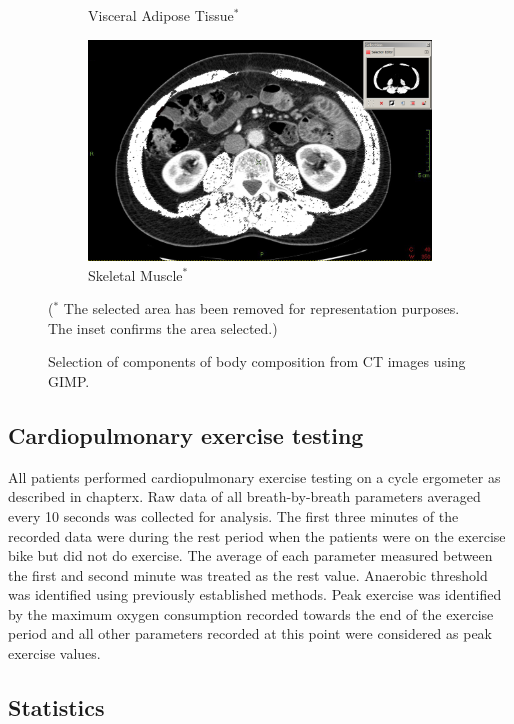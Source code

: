 \begin{figure}[htbp]
\begin{subfigure}{0.45\textwidth}
		\caption{Visceral Adipose Tissue$^*$}
		\label{fig:bc_ct_vat}
	\end{subfigure}
	\begin{subfigure}{0.45\textwidth}
		\centering
		\includegraphics[width=\textwidth]{Figures/bc_ct_sm}
		\caption{Skeletal Muscle$^*$}
		\label{fig:bc_ct_sm}
	\end{subfigure}
	
	\caption{Selection of components of body composition from CT images using GIMP.}($^*$ The selected area has been removed for representation purposes. The inset confirms the area selected.)
	\label{fig:bc_ct_gimp}
	
\end{figure}

\subsection{Cardiopulmonary exercise testing}
All patients performed cardiopulmonary exercise testing on a cycle ergometer as described in chapterx. Raw data of all breath-by-breath parameters averaged every 10 seconds was collected for analysis. The first three minutes of the recorded data were during the rest period when the patients were on the exercise bike but did not do exercise. The average of each parameter measured between the first and second minute was treated as the rest value. Anaerobic threshold was identified using previously established methods. \parencite{beaver_new_1986,sue_metabolic_1988} Peak exercise was identified by the maximum oxygen consumption recorded towards the end of the exercise period and all other parameters recorded at this point were considered as peak exercise values. 

\subsection{Statistics}

